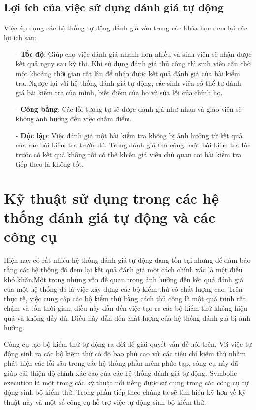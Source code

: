 \documentclass[12pt,a4paper]{article}
\begin{document}
\subsection{Lợi ích của việc sử dụng đánh giá tự động}
Việc áp dụng các hệ thống tự động đánh giá vào trong các khóa học đem lại các lợi ích sau:

\begin{itemize}
\item[-] \textbf{Tốc độ}: Giúp cho việc đánh giá nhanh hơn nhiều và sinh viên sẽ nhận được kết quả ngay sau kỳ thi. Khi sử dụng đánh giá thủ công thì sinh viên cần chờ một khoảng thời gian rất lâu để nhận được kết quả đánh giá của bài kiểm tra. Ngược lại với hệ thống đánh giá tự động, các sinh viên có thể tự đánh giá bài kiểm tra của mình, biết điểm của họ và sửa lỗi của chính họ.
\item[-] \textbf{Công bằng}: Các lỗi tương tự sẽ được đánh giá như nhau và giáo viên sẽ không ảnh hưởng đến việc chấm điểm.
\item[-] \textbf{Độc lập}: Việc đánh giá một bài kiểm tra không bị ảnh hưởng từ kết quả của các bài kiểm tra trước đó. Trong đánh giá thủ công, một bài kiểm tra lúc trước có kết quả không tốt có thê khiến giá viên chủ quan coi bài kiểm tra tiếp theo là không tốt.
\end{itemize}

\section{Kỹ thuật sử dụng trong các hệ thống đánh giá tự động và các công cụ}
Hiện nay có rất nhiều hệ thống đánh giá tự động đang tồn tại nhưng để đảm bảo rằng các hệ thống đó đem lại kết quả đánh giá một cách chính xác là một điều khó khăn.Một trong những vấn đề quan trọng ảnh hưởng đến kết quả đánh giá của một hệ thống đó là việc xây dựng các bộ kiểm thử có chất lượng cao. Trên thực tế, việc cung cấp các bộ kiểm thử bằng cách thủ công là một quá trình rất chậm và tốn thời gian, điều này dẫn đến việc tạo ra các bộ kiểm thử không hiệu quả và không đầy đủ. Điều này dẫn đến chất lượng của hệ thống đánh giá bị ảnh hưởng.

\indent Công cụ tạo bộ kiểm thử tự động ra đời để giải quyết vấn đề nói trên. Với việc tự động sinh ra các bộ kiểm thử có độ bao phủ cao với các tiêu chí kiểm thử nhằm phát hiện các lỗi sâu trong các hệ thống phần mêm phức tạp, công cụ này đã giúp cải thiện độ chính xác cao của các hệ thống đánh giá tự động. Symbolic execution là một trong các kỹ thuật nổi tiếng được sử dụng trong các công cụ tự động sinh bộ kiểm thử. Trong phần tiếp theo chúng ta sẽ tìm hiểu kỹ hơn về kỹ thuật này và một số công cụ hỗ trợ việc tự động sinh bộ kiểm thử.
\end{document}
